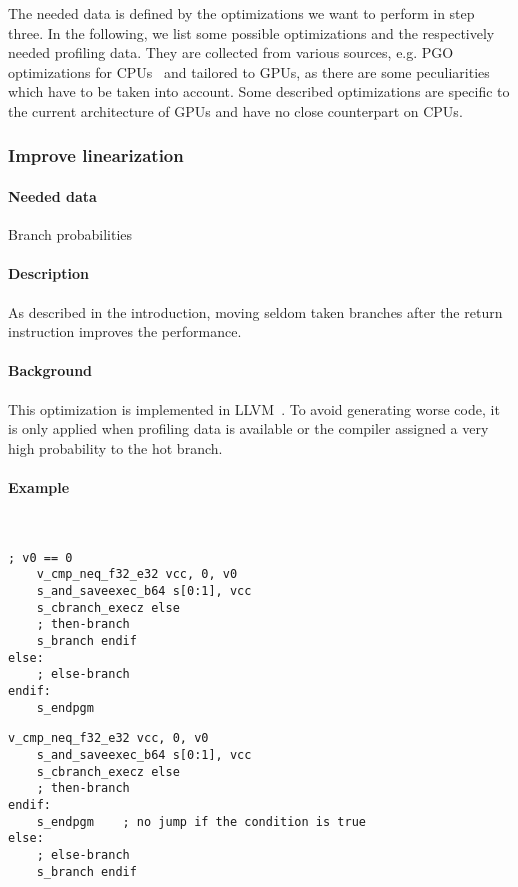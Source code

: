 The needed data is defined by the optimizations we want to perform in step three. In the following, we list some possible optimizations and the respectively needed profiling data. They are collected from various sources, e.g. PGO optimizations for CPUs~\cite{MicrosoftPgo} and tailored to GPUs, as there are some peculiarities which have to be taken into account. Some described optimizations are specific to the current architecture of GPUs and have no close counterpart on CPUs.

\subsubsection{Improve linearization}
\paragraph{Needed data} Branch probabilities
\paragraph{Description} As described in the introduction, moving seldom taken branches after the return instruction improves the performance.
\paragraph{Background} This optimization is implemented in LLVM~\cite{llvmLinearization}. To avoid generating worse code, it is only applied when profiling data is available or the compiler assigned a very high probability to the hot branch.
\paragraph{Example}\ \\
\begin{minipage}{.47\textwidth}
	\begin{lstlisting}[caption={Linearization --- unoptimized},frame=tlrb,language={[amdgpu]Assembler}]
	; v0 == 0
	v_cmp_neq_f32_e32 vcc, 0, v0
	s_and_saveexec_b64 s[0:1], vcc
	s_cbranch_execz else
	; then-branch
	s_branch endif
else:
	; else-branch
endif:
	s_endpgm
	\end{lstlisting}
\end{minipage}\hfill
\begin{minipage}{.47\textwidth}
	\begin{lstlisting}[caption={Linearization --- optimized},frame=tlrb,language={[amdgpu]Assembler}]
	v_cmp_neq_f32_e32 vcc, 0, v0
	s_and_saveexec_b64 s[0:1], vcc
	s_cbranch_execz else
	; then-branch
endif:
	s_endpgm    ; no jump if the condition is true
else:
	; else-branch
	s_branch endif
	\end{lstlisting}
\end{minipage}

